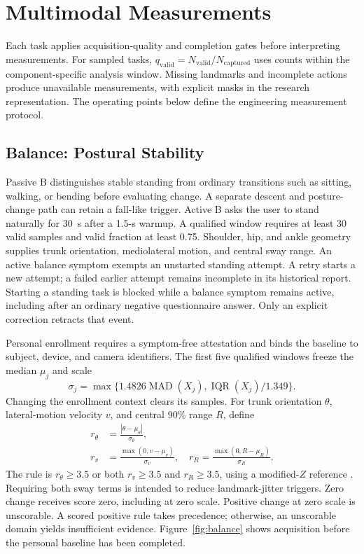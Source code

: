 \section{Multimodal Measurements}
\label{sec:methods}
Each task applies acquisition-quality and completion gates before interpreting measurements. For sampled tasks, $q_{\mathrm{valid}}=N_{\mathrm{valid}}/N_{\mathrm{captured}}$ uses counts within the component-specific analysis window. Missing landmarks and incomplete actions produce unavailable measurements, with explicit masks in the research representation. The operating points below define the engineering measurement protocol.

\subsection{Balance: Postural Stability}
\label{subsec:balance}
Passive B distinguishes stable standing from ordinary transitions such as
sitting, walking, or bending before evaluating change. A separate descent and
posture-change path can retain a fall-like trigger. Active B asks the user to
stand naturally for 30~s after a 1.5-s warmup. A qualified window requires
at least 30 valid samples and valid fraction at least 0.75. Shoulder, hip, and
ankle geometry supplies trunk
orientation, mediolateral motion, and central sway range. An active balance symptom exempts an unstarted standing attempt. A retry starts a new attempt; a failed earlier attempt remains incomplete in its historical report. Starting a standing task is blocked while a balance symptom remains active, including after an ordinary negative questionnaire answer. Only an explicit correction retracts that event.

Personal enrollment requires a symptom-free attestation and binds the baseline
to subject, device, and camera identifiers. The first five qualified windows
freeze the median $\mu_j$ and scale
\begin{equation}
\sigma_j=\max\{1.4826\operatorname{MAD}(X_j),
\operatorname{IQR}(X_j)/1.349\}.
\end{equation}
Changing the enrollment context clears its samples. For trunk orientation $\theta$, lateral-motion
velocity $v$, and central 90\% range $R$, define
\begin{align}
r_\theta&=\frac{|\theta-\mu_\theta|}{\sigma_\theta},\nonumber\\
r_v&=\frac{\max(0,v-\mu_v)}{\sigma_v},\quad
r_R=\frac{\max(0,R-\mu_R)}{\sigma_R}.
\end{align}
The rule is $r_\theta\geq3.5$ or both $r_v\geq3.5$ and $r_R\geq3.5$,
using a modified-$Z$ reference \cite{iglewicz1993outliers}. Requiring both sway
terms is intended to reduce landmark-jitter triggers. Zero change receives score zero, including at zero scale. Positive change at zero scale is unscorable. A scored positive rule takes precedence; otherwise, an unscorable domain yields insufficient evidence. Figure~\ref{fig:balance} shows acquisition before the
personal baseline has been completed.



